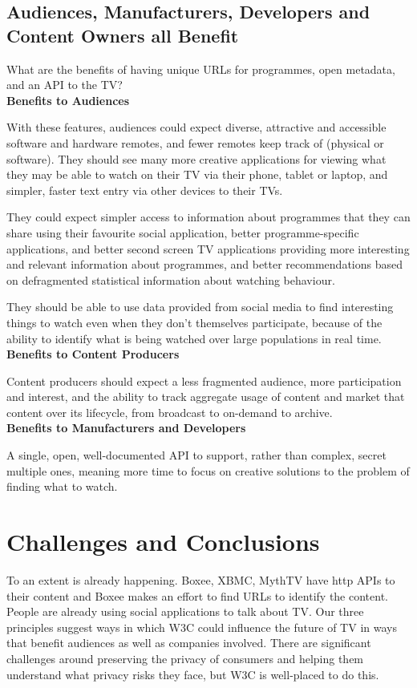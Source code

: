\documentclass[]{article}%
\begin{document}
\subsection{Audiences, Manufacturers, Developers and Content Owners all Benefit}

What are the benefits of having unique URLs for programmes, open metadata, and an API to the TV?
\\

{\bf{Benefits to Audiences}}

With these features, audiences could expect diverse, attractive and accessible software and hardware remotes, and fewer remotes keep track of (physical or software). They should see many more creative applications for viewing what they may be able to watch on their TV via their phone, tablet or laptop, and simpler, faster text entry via other devices to their TVs. 

They could expect simpler access to information about programmes that they can share using their favourite social application, better programme-specific applications, and better second screen TV applications providing more interesting and relevant information about programmes, and better recommendations based on defragmented statistical information about watching behaviour.

They should be able to use data provided from social media to find interesting things to watch even when they don't themselves participate, because of the ability to identify what is being watched over large populations in real time.
\\

{\bf{Benefits to Content Producers}}

Content producers should expect a less fragmented audience, more participation and interest, and the ability to track aggregate usage of content and market that content over its lifecycle, from broadcast to on-demand to archive.
\\

{\bf{Benefits to Manufacturers and Developers}}

A single, open, well-documented API to support, rather than complex, secret multiple ones, meaning more time to focus on creative solutions to the problem of finding what to watch.

\section{Challenges and Conclusions}

To an extent is already happening. Boxee, XBMC, MythTV have http APIs to their content and Boxee makes an effort to find URLs to identify the content. People are already using social applications to talk about TV. Our three principles suggest ways in which W3C could influence the future of TV in ways that benefit audiences as well as companies involved. There are significant challenges around preserving the privacy of consumers and helping them understand what privacy risks they face, but W3C is well-placed to do this.
\end{document}
